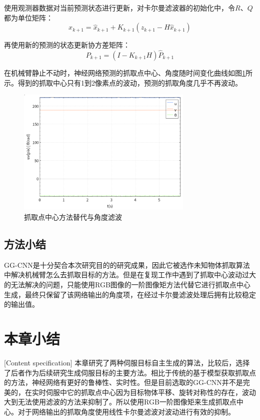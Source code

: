 \documentclass[fontset=fandol,type=bachelor,campus=harbin]{hithesisbook}
\begin{document}
使用观测器数据对当前预测状态进行更新，对卡尔曼滤波器的初始化中，令$R$、$Q$都为单位矩阵：
\begin{equation}
x_{k+1}=\hat{x}_{k+1}+K_{k+1}\left( z_{k+1}-H\hat{x}_{k+1} \right) 
\label{卡尔曼滤波的增益}
\end{equation}


再使用新的预测的状态更新协方差矩阵：
\begin{equation}
P_{k+1}=\left( I-K_{k+1}H \right) \hat{P}_{k+1}
\label{更新协方差矩阵}
\end{equation}


在机械臂静止不动时，神经网络预测的抓取点中心、角度随时间变化曲线如图\ref{抓取点中心方法替代与角度滤波}所示。得到的抓取中心只有1到2像素点的波动，预测的抓取角度几乎不再波动。
\begin{figure}[h]
\centering
\includegraphics[width = 0.75\textwidth]{chapter3/抓取点中心方法替代与角度滤波}
\caption{抓取点中心方法替代与角度滤波}
\label{抓取点中心方法替代与角度滤波}
\end{figure}

\subsection{方法小结}
GG-CNN是十分契合本次研究目的的研究成果，因此它被选作未知物体抓取算法中解决机械臂怎么去抓取目标的方法。但是在复现工作中遇到了抓取中心波动过大的无法解决的问题，只能使用RGB图像的一阶图像矩方法代替它进行抓取点中心生成，最终只保留了该网络输出的角度项，在经过卡尔曼滤波处理后拥有比较稳定的输出值。

\section{本章小结}[Content specification]
本章研究了两种伺服目标自主生成的算法，比较后，选择了后者作为后续研究生成伺服目标的主要方法。相比于传统的基于模型获取抓取点的方法，神经网络有更好的鲁棒性、实时性。但是目前选取的GG-CNN并不是完美的，在实时伺服中它的抓取点中心因为目标物体平移、旋转对称性的存在，波动大到无法使用滤波的方法来抑制了。所以使用RGB一阶图像矩来生成抓取点中心。对于网络输出的抓取角度使用线性卡尔曼滤波对波动进行有效的抑制。
\end{document}
